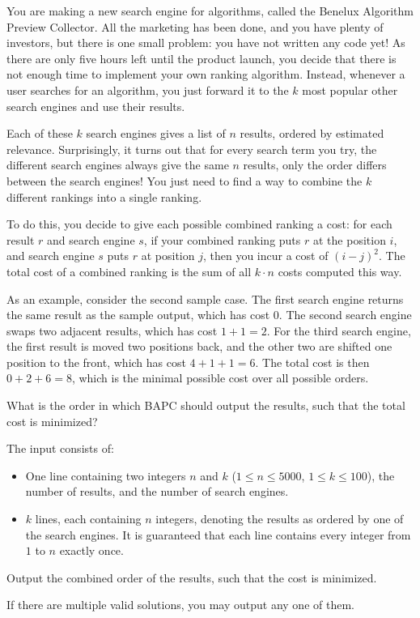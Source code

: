 

\newcommand{\maxn}{5000}
\newcommand{\maxk}{100}

You are making a new search engine for algorithms, called the Benelux Algorithm Preview Collector.
All the marketing has been done, and you have plenty of investors, but there is one small problem:
you have not written any code yet!
As there are only five hours left until the product launch, you decide that there
is not enough time to implement your own ranking algorithm.
Instead, whenever a user searches for an algorithm, you just forward it to the $k$ most popular other search engines and use their results.

Each of these $k$ search engines gives a list of $n$ results, ordered by estimated relevance.
Surprisingly, it turns out that for every search term you try, the different search engines always give the same $n$ results, only the order differs between the search engines!
You just need to find a way to combine the $k$ different rankings into a single ranking.

To do this, you decide to give each possible combined ranking a cost:
for each result $r$ and search engine $s$, if your combined ranking puts $r$ at the position $i$, and search engine $s$ puts $r$ at position $j$, then you incur a cost of $(i-j)^2$.
The total cost of a combined ranking is the sum of all $k \cdot n$ costs computed this way.

As an example, consider the second sample case.
The first search engine returns the same result as the sample output, which has cost $0$.
The second search engine swaps two adjacent results, which has cost $1+1=2$.
For the third search engine, the first result is moved two positions back,
and the other two are shifted one position to the front,
which has cost $4+1+1=6$.
The total cost is then $0+2+6=8$, which is the minimal possible cost over all
possible orders.

What is the order in which BAPC should output the results, such that the total cost is minimized?

\begin{Input}
	The input consists of:
	\begin{itemize}
		\item One line containing two integers $n$ and $k$ ($1\leq n\leq \maxn$, $1\leq k\leq \maxk$), the number of results, and the number of search engines.
		\item $k$ lines, each containing $n$ integers,
		    denoting the results as ordered by one of the search engines.
		    It is guaranteed that each line contains every integer from $1$ to $n$ exactly once.
	\end{itemize}
\end{Input}

\begin{Output}
	Output the combined order of the results, such that the cost is minimized.

	If there are multiple valid solutions, you may output any one of them.
\end{Output}

\pagebreak%
